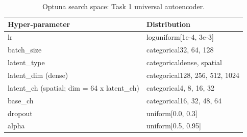 \begin{table}[t]
\centering
\caption{Optuna search space: Task 1 universal autoencoder.}
\label{tab:optuna_ae_universal_space}
\footnotesize
\begin{tabular}{ll}
\toprule
Hyper-parameter & Distribution \\
\midrule
lr & loguniform[1e-4, 3e-3] \\
batch\_size & categorical{32, 64, 128} \\
latent\_type & categorical{dense, spatial} \\
latent\_dim (dense) & categorical{128, 256, 512, 1024} \\
latent\_ch (spatial; dim = 64 x latent\_ch) & categorical{4, 8, 16, 32} \\
base\_ch & categorical{16, 32, 48, 64} \\
dropout & uniform[0.0, 0.3] \\
alpha & uniform[0.5, 0.95] \\
\bottomrule
\end{tabular}
\end{table}
